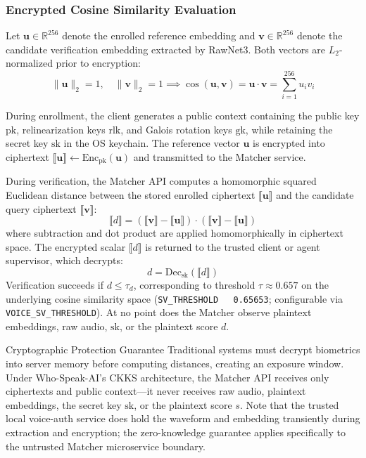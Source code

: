 \subsubsection{Encrypted Cosine Similarity Evaluation}
Let $\mathbf{u} \in \mathbb{R}^{256}$ denote the enrolled reference embedding and $\mathbf{v} \in \mathbb{R}^{256}$ denote the candidate verification embedding extracted by RawNet3. Both vectors are $L_2$-normalized prior to encryption:
\begin{equation}
    \|\mathbf{u}\|_2 = 1, \quad \|\mathbf{v}\|_2 = 1 \implies \cos(\mathbf{u}, \mathbf{v}) = \mathbf{u} \cdot \mathbf{v} = \sum_{i=1}^{256} u_i v_i
\end{equation}

During enrollment, the client generates a public context containing the public key $\text{pk}$, relinearization keys $\text{rlk}$, and Galois rotation keys $\text{gk}$, while retaining the secret key $\text{sk}$ in the OS keychain. The reference vector $\mathbf{u}$ is encrypted into ciphertext $\llbracket \mathbf{u} \rrbracket \leftarrow \text{Enc}_{\text{pk}}(\mathbf{u})$ and transmitted to the Matcher service.

During verification, the Matcher API computes a homomorphic squared Euclidean distance between the stored enrolled ciphertext $\llbracket \mathbf{u} \rrbracket$ and the candidate query ciphertext $\llbracket \mathbf{v} \rrbracket$:
\begin{equation}
    \llbracket d \rrbracket = (\llbracket \mathbf{v} \rrbracket - \llbracket \mathbf{u} \rrbracket) \cdot (\llbracket \mathbf{v} \rrbracket - \llbracket \mathbf{u} \rrbracket)
\end{equation}
where subtraction and dot product are applied homomorphically in ciphertext space. The encrypted scalar $\llbracket d \rrbracket$ is returned to the trusted client or agent supervisor, which decrypts:
\begin{equation}
    d = \text{Dec}_{\text{sk}}(\llbracket d \rrbracket)
\end{equation}
Verification succeeds if $d \le \tau_{d}$, corresponding to threshold $\tau \approx 0.657$ on the underlying cosine similarity space (\texttt{SV\_THRESHOLD ~ 0.65653}; configurable via \texttt{VOICE\_SV\_THRESHOLD}). At no point does the Matcher observe plaintext embeddings, raw audio, $\text{sk}$, or the plaintext score $d$.

\begin{warmbox}[title=Homomorphic Zero-Trust Guarantee]{Cryptographic Protection Guarantee}
Traditional systems must decrypt biometrics into server memory before computing distances, creating an exposure window. Under Who-Speak-AI's CKKS architecture, the Matcher API receives only ciphertexts and public context---it never receives raw audio, plaintext embeddings, the secret key $\text{sk}$, or the plaintext score $s$. Note that the trusted local voice-auth service does hold the waveform and embedding transiently during extraction and encryption; the zero-knowledge guarantee applies specifically to the untrusted Matcher microservice boundary.
\end{warmbox}

